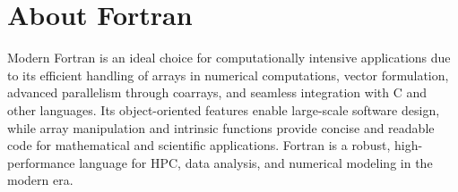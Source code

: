 % 

\section{About Fortran}

Modern Fortran is an ideal choice for computationally intensive applications due to its efficient handling of arrays in numerical computations, vector formulation, advanced parallelism through coarrays, and seamless integration with C and other languages. Its object-oriented features enable large-scale software design, while array manipulation and intrinsic functions provide concise and readable code for mathematical and scientific applications. Fortran is a robust, high-performance language for HPC, data analysis, and numerical modeling in the modern era.

